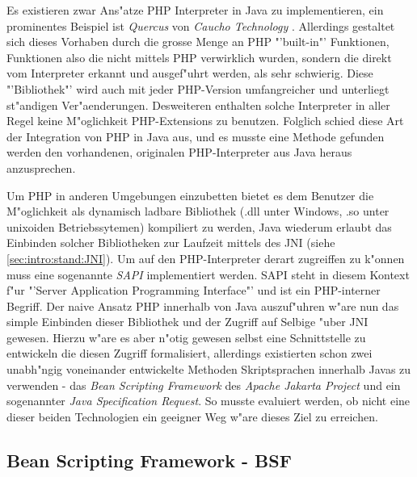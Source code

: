 Es existieren zwar Ans"atze PHP Interpreter in Java zu implementieren, ein prominentes Beispiel
ist \emph{Quercus} von \emph{Caucho Technology} \cite{CAUCHOHP}. Allerdings gestaltet sich dieses Vorhaben durch
die grosse Menge an PHP "'built-in"' Funktionen, Funktionen also die nicht mittels PHP verwirklich wurden, 
sondern die direkt vom Interpreter erkannt und ausgef"uhrt werden, als sehr schwierig. Diese "'Bibliothek"' wird
auch mit jeder PHP-Version umfangreicher und unterliegt  st"andigen Ver"aenderungen. Desweiteren enthalten solche
Interpreter in aller Regel keine M"oglichkeit PHP-Extensions zu benutzen. Folglich schied diese Art der
Integration von PHP in Java aus, und es musste eine Methode gefunden werden den vorhandenen, originalen PHP-Interpreter
aus Java heraus anzusprechen.

Um PHP in anderen Umgebungen einzubetten bietet es dem Benutzer die M"oglichkeit als dynamisch ladbare
Bibliothek (.dll unter Windows, .so unter unixoiden Betriebssytemen) kompiliert zu werden, Java wiederum
erlaubt das Einbinden solcher Bibliotheken zur Laufzeit mittels des JNI (siehe \ref{sec:intro:stand:JNI}).
Um auf den PHP-Interpreter derart zugreiffen zu k"onnen muss eine sogenannte \emph{SAPI} implementiert
werden. SAPI steht in diesem Kontext f"ur "'Server Application Programming Interface"' und ist ein PHP-interner
Begriff. 
Der naive Ansatz PHP innerhalb von Java auszuf"uhren w"are nun das simple Einbinden dieser Bibliothek und
der Zugriff auf Selbige "uber JNI gewesen. Hierzu w"are es aber n"otig gewesen selbst eine Schnittstelle 
zu entwickeln die diesen Zugriff formalisiert, allerdings existierten schon zwei unabh"ngig voneinander entwickelte
Methoden Skriptsprachen innerhalb Javas zu verwenden - das \emph{Bean Scripting Framework} des \emph{Apache
Jakarta Project} und ein sogenannter \emph{Java Specification Request}. So musste evaluiert werden, ob nicht
eine dieser beiden Technologien ein geeigner Weg w"are dieses Ziel zu erreichen. 

\subsection{Bean Scripting Framework - BSF}
\label{sec:chap1:ana:bsf}

